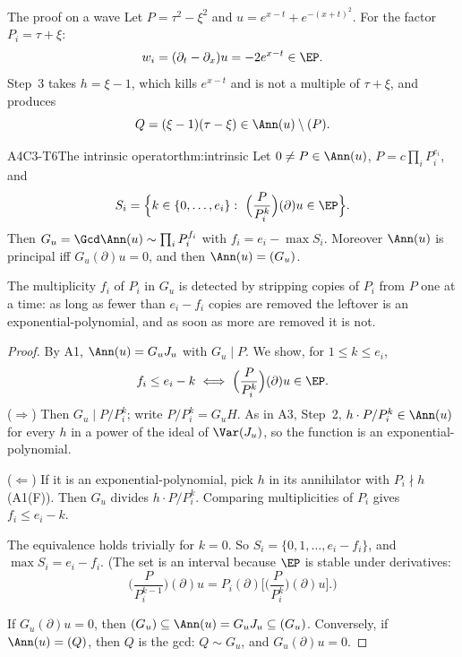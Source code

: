\begin{example}{The proof on a wave}
Let $P=\tau^2-\xi^2$ and $u=e^{x-t}+e^{-(x+t)^2}$. For the factor $P_i=\tau+\xi$:
\[
w_i=(\partial_t-\partial_x)u=-2e^{x-t}\in\EP .
\]
Step~3 takes $h=\xi-1$, which kills $e^{x-t}$ and is not a multiple of $\tau+\xi$, and produces
\[
Q=(\xi-1)(\tau-\xi)\in\Ann(u)\setminus(P).
\]
\end{example}

\begin{dimcard}{A4}{C3-T6}{The intrinsic operator}{\proved}{thm:intrinsic}
Let $0\ne P\in\Ann(u)$, $P=c\prod_iP_i^{e_i}$, and
\[
S_i=\Big\{k\in\{0,\dots,e_i\}:\ \Big(\frac{P}{P_i^k}\Big)(\partial)u\in\EP\Big\}.
\]
Then $G_u=\Gcd\Ann(u)\sim\prod_iP_i^{f_i}$ with $f_i=e_i-\max S_i$. Moreover $\Ann(u)$ is principal iff $G_u(\partial)u=0$, and then $\Ann(u)=(G_u)$.
\end{dimcard}

\begin{proofidea}
The multiplicity $f_i$ of $P_i$ in $G_u$ is detected by stripping copies of $P_i$ from $P$ one at a time: as long as fewer than $e_i-f_i$ copies are removed the leftover is an exponential-polynomial, and as soon as more are removed it is not.
\end{proofidea}

\begin{proof}
By A1, $\Ann(u)=G_uJ_u$ with $G_u\mid P$. We show, for $1\le k\le e_i$,
\[
f_i\le e_i-k\iff\Big(\frac{P}{P_i^k}\Big)(\partial)u\in\EP .
\]
($\Rightarrow$) Then $G_u\mid P/P_i^k$; write $P/P_i^k=G_uH$. As in A3, Step~2, $h\cdot P/P_i^k\in\Ann(u)$ for every $h$ in a power of the ideal of $\Var(J_u)$, so the function is an exponential-polynomial.

($\Leftarrow$) If it is an exponential-polynomial, pick $h$ in its annihilator with $P_i\nmid h$ (A1(F)). Then $G_u$ divides $h\cdot P/P_i^k$. Comparing multiplicities of $P_i$ gives $f_i\le e_i-k$.

The equivalence holds trivially for $k=0$. So $S_i=\{0,1,\dots,e_i-f_i\}$, and $\max S_i=e_i-f_i$. (The set is an interval because $\EP$ is stable under derivatives:
\[
\Big(\frac{P}{P_i^{k-1}}\Big)(\partial)u=P_i(\partial)\Big[\Big(\frac{P}{P_i^k}\Big)(\partial)u\Big].)
\]

If $G_u(\partial)u=0$, then $(G_u)\subseteq\Ann(u)=G_uJ_u\subseteq(G_u)$. Conversely, if $\Ann(u)=(Q)$, then $Q$ is the gcd: $Q\sim G_u$, and $G_u(\partial)u=0$.

\end{proof}

